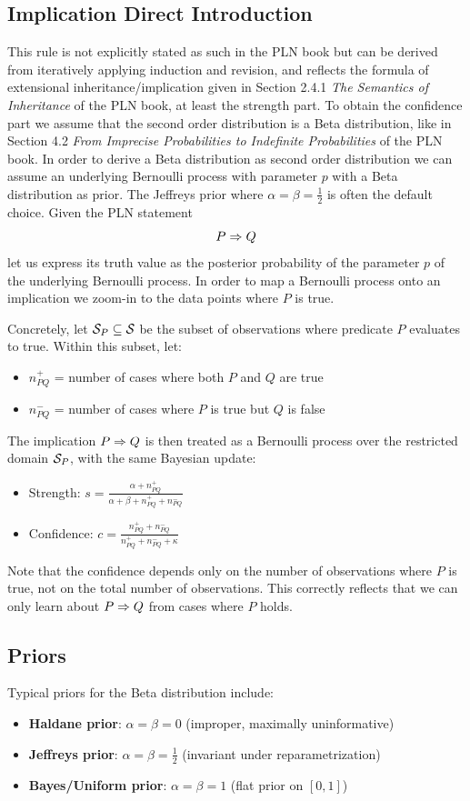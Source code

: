 \documentclass[]{article}
\begin{document}
\subsection{Implication Direct Introduction}
\label{sec:impldirect}
This rule is not explicitly stated as such in the PLN book but can be
derived from iteratively applying induction and revision, and reflects
the formula of extensional inheritance/implication given in Section
2.4.1 \emph{The Semantics of Inheritance} of the PLN book, at least
the strength part.  To obtain the confidence part we assume that the
second order distribution is a Beta distribution, like in Section
4.2 \emph{From Imprecise Probabilities to Indefinite Probabilities} of
the PLN book.  In order to derive a Beta distribution as second order
distribution we can assume an underlying Bernoulli process with
parameter $p$ with a Beta distribution as prior.  The Jeffreys prior
where $\alpha=\beta=\frac{1}{2}$ is often the default choice.  Given
the PLN statement
$$P \Rightarrow Q$$ let us express its truth value as the posterior
probability of the parameter $p$ of the underlying Bernoulli process.
In order to map a Bernoulli process onto an implication we zoom-in to
the data points where $P$ is true.

Concretely, let $\mathcal{S}_P \subseteq \mathcal{S}$ be the subset of
observations where predicate $P$ evaluates to true.  Within this
subset, let:
\begin{itemize}
\item $n^+_{PQ}$ = number of cases where both $P$ and $Q$ are true
\item $n^-_{PQ}$ = number of cases where $P$ is true but $Q$ is false
\end{itemize}

The implication $P \Rightarrow Q$ is then treated as a Bernoulli process
over the restricted domain $\mathcal{S}_P$, with the same Bayesian
update:
\begin{itemize}
\item Strength: $s = \frac{\alpha + n^+_{PQ}}{\alpha + \beta + n^+_{PQ} + n^-_{PQ}}$
\item Confidence: $c = \frac{n^+_{PQ} + n^-_{PQ}}{n^+_{PQ} + n^-_{PQ} + \kappa}$
\end{itemize}

Note that the confidence depends only on the number of observations
where $P$ is true, not on the total number of observations.  This
correctly reflects that we can only learn about $P \Rightarrow Q$ from cases
where $P$ holds.

\subsection{Priors}
\label{sec:priors}
Typical priors for the Beta distribution include:
\begin{itemize}
\item \textbf{Haldane prior}: $\alpha = \beta = 0$ (improper, maximally uninformative)
\item \textbf{Jeffreys prior}: $\alpha = \beta = \frac{1}{2}$ (invariant under reparametrization)
\item \textbf{Bayes/Uniform prior}: $\alpha = \beta = 1$ (flat prior on $[0,1]$)
\end{itemize}
\end{document}
